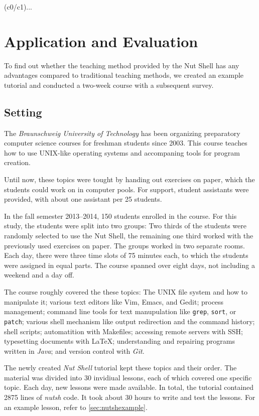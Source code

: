 \documentclass[paper=a4,twoside,abstract=on,cleardoublepage=empty,numbers=noenddot,toc=bib,12pt,appendixprefix=true]{scrreprt}
\begin{document}
(c0/c1)...

\chapter{Application and Evaluation}
\label{sec:evaluation}

To find out whether the teaching method provided by the Nut Shell has any advantages compared to traditional teaching methods, we created an example tutorial and conducted a two-week course with a subsequent survey.

\section{Setting}

The \textit{Braunschweig University of Technology} has been organizing preparatory computer science courses for freshman students since 2003. This course teaches how to use UNIX-like operating systems and accompaning tools for program creation.

Until now, these topics were tought by handing out exercises on paper, which the students could work on in computer pools. For support, student assistants were provided, with about one assistant per 25 students.

In the fall semester 2013--2014, 150 students enrolled in the course. For this study, the students were split into two groups: Two thirds of the students were randomly selected to use the Nut Shell, the remaining one third worked with the previously used exercises on paper. The groups worked in two separate rooms. Each day, there were three time slots of 75 minutes each, to which the students were assigned in equal parts. The course spanned over eight days, not including a weekend and a day off.

The course roughly covered the these topics: The \textsc{UNIX} file system and how to manipulate it; various text editors like Vim, Emacs, and Gedit; process management; command line tools for text manupulation like \texttt{grep}, \texttt{sort}, or \texttt{patch}; various shell mechanism like output redirection and the command history; shell scripts; automatition with Makefiles; accessing remote servers with \textsc{SSH}; typesetting documents with \LaTeX; understanding and repairing programs written in \textit{Java}; and version control with \textit{Git}.

The newly created \textit{Nut Shell} tutorial kept these topics and their order. The material was divided into 30 invidiual lessons, each of which covered one specific topic. Each day, new lessons were made available. In total, the tutorial contained 2875 lines of \textit{nutsh} code. It took about 30 hours to write and test the lessons. For an example lesson, refer to \cref{sec:nutshexample}.
\end{document}
